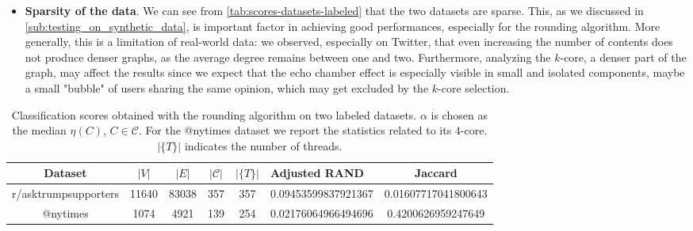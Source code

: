 \begin{itemize}
	\item \textbf{Sparsity of the data}. We can see from
	      \autoref{tab:scores-datasets-labeled} that the two datasets are
	      sparse.
	      This, as we discussed in \autoref{sub:testing_on_synthetic_data}, is
	      important factor in achieving good performances, especially for the
	      rounding algorithm.
	      More generally, this is a limitation of real-world data:
	      we observed, especially on Twitter, that even increasing the number of
	      contents does not produce denser graphs, as the average degree remains
	      between one and two.
	      Furthermore, analyzing the $k$-core, a denser part of the graph, may
	      affect the results since we expect that the echo chamber effect is
	      especially visible in small and isolated components, maybe a small
	      "bubble" of users sharing the same opinion, which may get excluded by
	      the $k$-core selection.

\end{itemize}

\begin{table}
	\centering
	\caption[Classification scores obtained with the
		rounding algorithm on two labeled datasets]{Classification scores obtained with the
		rounding algorithm on two labeled datasets. $\alpha $ is chosen as the
		median $\eta(C)$, $C \in
			\mathcal{C} $. For the @nytimes dataset we report the statistics
		related to its $4$-core. $|\{T\}|$ indicates the number of threads.}
	\label{tab:scores-datasets-labeled}
	{\small
		\begin{tabular}{|ccccc p{1.8cm} c|}
			\toprule
			Dataset              & $|V|$         & $|E|$                     & $|\mathcal{C}| $          &
			$|\{T\}| $           & Adjusted RAND & Jaccard                                                                                                            \\
			\midrule
			r/asktrumpsupporters & 11640         & 83038                     & 357
			                     & 357           & \num{0.09453599837921367} & \num{0.01607717041800643}                                                              \\
			@nytimes             & 1074          & 4921                      & 139                       & 254 & \num{0.02176064966494696} & \num{0.4200626959247649} \\
			\bottomrule
		\end{tabular}
	}
\end{table}


